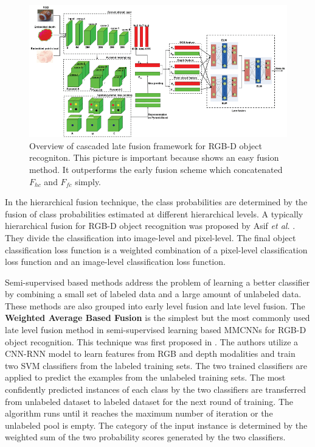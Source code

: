 \begin{figure}[h!]
	\centering
	\includegraphics[width=0.8\linewidth]{images/late-fusion-elm.png}
	\caption{Overview of cascaded late fusion framework for RGB-D object recogniton. This picture is important because shows an easy fusion method. It outperforms the early fusion scheme which
		concatenated $F_{hc}$ and $F_{fc}$ simply.}
\end{figure}

In the hierarchical fusion technique, the class probabilities are determined by the fusion of class probabilities estimated at different hierarchical levels.  A typically hierarchical fusion 
for RGB-D object recognition was proposed by Asif \textit{et al.} \cite{8022892}. They divide the classification into image-level and pixel-level. The final object classification loss function
is a weighted combination of a pixel-level classification loss function and an image-level classification loss function.


Semi-supervised based methods address the problem of learning a better classifier by combining a small set of labeled data and a large amount of unlabeled data. These methods are also grouped into early level fusion
and late level fusion. The \textbf{Weighted Average Based Fusion} is the simplest but
the most commonly used late level fusion method in semi-supervised learning based MMCNNs for RGB-D object
recognition. This technique was first proposed in \cite{76543}. The authors utilize a CNN-RNN model to learn
features from RGB and depth modalities and train two
SVM classifiers from the labeled training sets. The two trained classifiers are applied to predict the examples from the unlabeled training sets. The most confidently
predicted instances of each class by the two classifiers are
transferred from unlabeled dataset to labeled dataset for the
next round of training. The algorithm runs until it reaches the
maximum number of iteration or the unlabeled pool is
empty. The category of the input instance is determined
by the weighted sum of the two probability scores generated
by the two classifiers.


